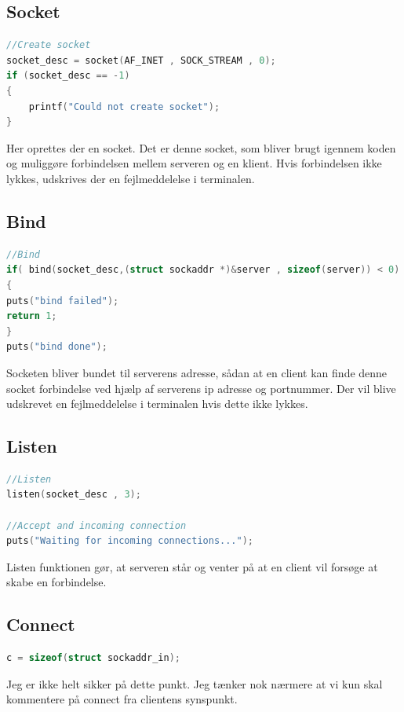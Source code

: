 \documentclass[12pt,fleqn,a4paper]{report}
\begin{document}
\subsection{Socket}
\begin{lstlisting}[language=C++]
//Create socket
socket_desc = socket(AF_INET , SOCK_STREAM , 0);
if (socket_desc == -1)
{
	printf("Could not create socket");
}
\end{lstlisting}

Her oprettes der en socket. Det er denne socket, som bliver brugt igennem koden og muliggøre forbindelsen mellem serveren og en klient. Hvis forbindelsen ikke lykkes, udskrives der en fejlmeddelelse i terminalen. 
 
\subsection{Bind}
\begin{lstlisting}[language=C++]
//Bind
if( bind(socket_desc,(struct sockaddr *)&server , sizeof(server)) < 0)
{
puts("bind failed");
return 1;
}
puts("bind done");
\end{lstlisting}

Socketen bliver bundet til serverens adresse,  sådan at en client kan finde denne socket forbindelse ved hjælp af serverens ip adresse og portnummer. Der vil blive udskrevet en fejlmeddelelse i terminalen hvis dette ikke lykkes.

\subsection{Listen}
\begin{lstlisting}[language=C++]
//Listen
listen(socket_desc , 3);

//Accept and incoming connection
puts("Waiting for incoming connections...");
\end{lstlisting}

Listen funktionen gør, at serveren står og venter på at en client vil forsøge at skabe en forbindelse. 

\subsection{Connect}
\begin{lstlisting}[language=C++]
c = sizeof(struct sockaddr_in);
\end{lstlisting}
 Jeg er ikke helt sikker på dette punkt. Jeg tænker nok nærmere at vi kun skal kommentere på connect fra clientens synspunkt. 
 
\end{document}
